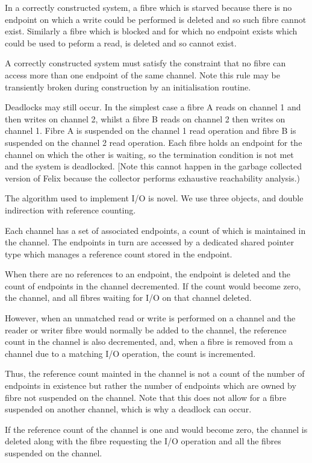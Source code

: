 \documentclass[oneside]{book}
\begin{document}
In a correctly constructed system, a fibre which is starved because there is no
endpoint on which a write could be performed is deleted and so
such fibre cannot exist. Similarly a fibre which is blocked
and for which no endpoint exists which could be used to
peform a read, is deleted and so cannot exist.

A correctly constructed system must satisfy the constraint that
no fibre can access more than one endpoint of the same channel.
Note this rule may be transiently broken during construction
by an initialisation routine.

Deadlocks may still occur. In the simplest case a fibre A
reads on channel 1 and then writes on channel 2, whilst a fibre
B reads on channel 2 then writes on channel 1. Fibre A is suspended
on the channel 1 read operation and fibre B is suspended on the
channel 2 read operation. Each fibre holds an endpoint for the channel
on which the other is waiting, so the termination condition is not met
and the system is deadlocked. [Note this cannot happen in the garbage
collected version of Felix because the collector performs exhaustive
reachability analysis.)

The algorithm used to implement I/O is novel. We use three objects,
and double indirection with reference counting.

Each channel has a set of associated endpoints, a count of which
is maintained in the channel. The endpoints in turn are accessed
by a dedicated shared pointer type which manages a reference count
stored in the endpoint.

When there are no references to an endpoint, the endpoint is
deleted and the count of endpoints in the channel decremented.
If the count would become zero, the channel, and all fibres
waiting for I/O on that channel deleted.

However, when an unmatched read or write is performed on a channel
and the reader or writer fibre would normally be added to the channel,
the reference count in the channel is also decremented, and, when a
fibre is removed from a channel due to a matching I/O operation,
the count is incremented.

Thus, the reference count mainted in the channel is not a count
of the number of endpoints in existence but rather the number
of endpoints which are owned by fibre not suspended on the channel.
Note that this does not allow for a fibre suspended on another channel,
which is why a deadlock can occur.

If the reference count of the channel is one and would become
zero, the channel is deleted along with the fibre requesting
the I/O operation and all the fibres suspended on the channel.
\end{document}
